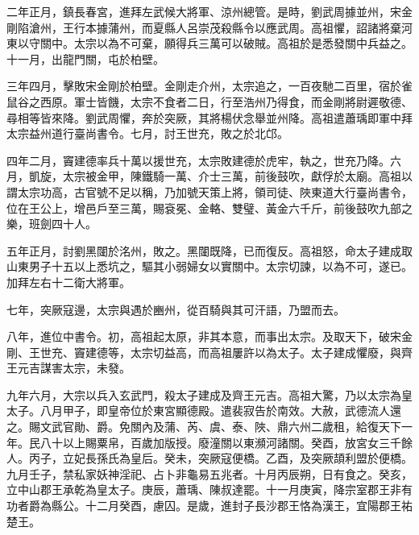 \begin{pinyinscope}
 二年正月，鎮長春宮，進拜左武候大將軍、涼州總管。是時，劉武周據並州，宋金剛陷滄州，王行本據蒲州，而夏縣人呂崇茂殺縣令以應武周。高祖懼，詔諸將棄河東以守關中。太宗以為不可棄，願得兵三萬可以破賊。高祖於是悉發關中兵益之。十一月，出龍門關，屯於柏壁。



 三年四月，擊敗宋金剛於柏壁。金剛走介州，太宗追之，一百夜馳二百里，宿於雀鼠谷之西原。軍士皆饑，太宗不食者二日，行至浩州乃得食，而金剛將尉遲敬德、尋相等皆來降。劉武周懼，奔於突厥，其將楊伏念舉並州降。高祖遣蕭瑀即軍中拜太宗益州道行臺尚書令。七月，討王世充，敗之於北邙。



 四年二月，竇建德率兵十萬以援世充，太宗敗建德於虎牢，執之，世充乃降。六月，凱旋，太宗被金甲，陳鐵騎一萬、介士三萬，前後鼓吹，獻俘於太廟。高祖以謂太宗功高，古官號不足以稱，乃加號天策上將，領司徒、陜東道大行臺尚書令，位在王公上，增邑戶至三萬，賜袞冕、金輅、雙璧、黃金六千斤，前後鼓吹九部之樂，班劍四十人。



 五年正月，討劉黑闥於洺州，敗之。黑闥既降，已而復反。高祖怒，命太子建成取山東男子十五以上悉坑之，驅其小弱婦女以實關中。太宗切諫，以為不可，遂已。加拜左右十二衛大將軍。



 七年，突厥寇邊，太宗與遇於豳州，從百騎與其可汗語，乃盟而去。



 八年，進位中書令。初，高祖起太原，非其本意，而事出太宗。及取天下，破宋金剛、王世充、竇建德等，太宗切益高，而高祖屢許以為太子。太子建成懼廢，與齊王元吉謀害太宗，未發。



 九年六月，大宗以兵入玄武門，殺太子建成及齊王元吉。高祖大驚，乃以太宗為皇太子。八月甲子，即皇帝位於東宮顯德殿。遣裴寂告於南效。大赦，武德流人還之。賜文武官勛、爵。免關內及蒲、芮、虞、泰、陜、鼎六州二歲租，給復天下一年。民八十以上賜粟帛，百歲加版授。廢潼關以東瀕河諸關。癸酉，放宮女三千餘人。丙子，立妃長孫氏為皇后。癸未，突厥寇便橋。乙酉，及突厥頡利盟於便橋。九月壬子，禁私家妖神淫祀、占卜非龜易五兆者。十月丙辰朔，日有食之。癸亥，立中山郡王承乾為皇太子。庚辰，蕭瑀、陳叔達罷。十一月庚寅，降宗室郡王非有功者爵為縣公。十二月癸酉，慮囚。是歲，進封子長沙郡王恪為漢王，宜陽郡王祐楚王。




\end{pinyinscope}
